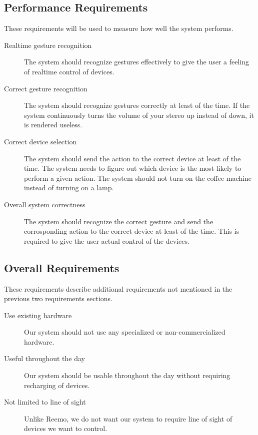 \subsection{Performance Requirements}
These requirements will be used to measure how well the system performs. 
\begin{description}
    \item[Realtime gesture recognition] The system should recognize gestures effectively to give the user a feeling of realtime control of devices.
    \item[Correct gesture recognition] The system should recognize gestures correctly at least  of the time. If the system continuously turns the volume of your stereo up instead of down, it is rendered useless.  
    \item[Correct device selection] The system should send the action to the correct device at least  of the time. The system needs to figure out which device is the most likely to perform a given action. The system should not turn on the coffee machine instead of turning on a lamp.
    \item[Overall system correctness] The system should recognize the correct gesture and send the corrosponding action to the correct device at least  of the time. This is required to give the user actual control of the devices. 
\end{description}
    
\subsection{Overall Requirements}
These requirements describe additional requirements not mentioned in the previous two requirements sections.
\begin{description}
    \item[Use existing hardware] Our system should not use any specialized or non-commercialized hardware.  
    \item[Useful throughout the day] Our system should be usable throughout the day without requiring recharging of devices. 
    \item[Not limited to line of sight] Unlike Reemo, we do not want our system to require line of sight of devices we want to control. 
\end{description}
